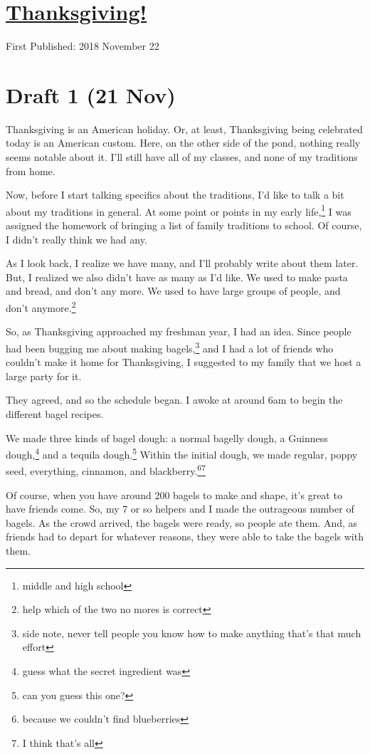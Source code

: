 \documentclass[12pt]{article}[titlepage]
\newcommand{\1}{\={a}}
\newcommand{\2}{\={e}}
\newcommand{\3}{\={\i}}
\newcommand{\4}{\=o}
\newcommand{\5}{\=u}
\newcommand{\6}{\={A}}
\renewcommand{\,}{\textsuperscript{,}}
\begin{document}
\doublespacing
\section{\href{thanksgiving-2018.html}{Thanksgiving!}}
First Published: 2018 November 22
\section{Draft 1 (21 Nov)}
Thanksgiving is an American holiday.
Or, at least, Thanksgiving being celebrated today is an American custom.
Here, on the other side of the pond, nothing really seems notable about it.
I'll still have all of my classes, and none of my traditions from home.

Now, before I start talking specifics about the traditions, I'd like to talk a bit about my traditions in general.
At some point or points in my early life,\footnote{middle and high school} I was assigned the homework of bringing a list of family traditions to school.
Of course, I didn't really think we had any.

As I look back, I realize we have many, and I'll probably write about them later.
But, I realized we also didn't have as many as I'd like.
We used to make pasta and bread, and don't any more.
We used to have large groups of people, and don't anymore.\footnote{help which of the two no mores is correct}

So, as Thanksgiving approached my freshman year, I had an idea.
Since people had been bugging me about making bagels,\footnote{side note, never tell people you know how to make anything that's that much effort} and I had a lot of friends who couldn't make it home for Thanksgiving, I suggested to my family that we host a large party for it.

They agreed, and so the schedule began.
I awoke at around 6am to begin the different bagel recipes.

We made three kinds of bagel dough: a normal bagelly dough, a Guinness dough,\footnote{guess what the secret ingredient was} and a tequila dough.\footnote{can you guess this one?}
Within the initial dough, we made regular, poppy seed, everything, cinnamon, and blackberry.\footnote{because we couldn't find blueberries}\footnote{I think that's all}

Of course, when you have around 200 bagels to make and shape, it's great to have friends come.
So, my 7 or so helpers and I made the outrageous number of bagels.
As the crowd arrived, the bagels were ready, so people ate them.
And, as friends had to depart for whatever reasons, they were able to take the bagels with them.
\end{document}
